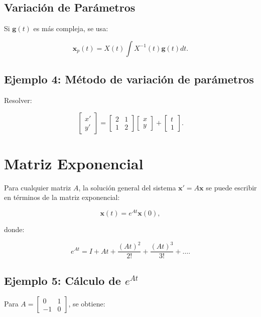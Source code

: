 \subsection{Variación de Parámetros}
Si \( \mathbf{g}(t) \) es más compleja, se usa:

\begin{equation}
\mathbf{x}_p(t) = X(t) \int X^{-1}(t) \mathbf{g}(t) dt.
\end{equation}

\subsection*{Ejemplo 4: Método de variación de parámetros}
Resolver:

\begin{equation}
\begin{bmatrix} x' \\ y' \end{bmatrix} =
\begin{bmatrix} 2 & 1 \\ 1 & 2 \end{bmatrix}
\begin{bmatrix} x \\ y \end{bmatrix} +
\begin{bmatrix} t \\ 1 \end{bmatrix}.
\end{equation}

\section{Matriz Exponencial}
Para cualquier matriz \( A \), la solución general del sistema \( \mathbf{x'} = A\mathbf{x} \) se puede escribir en términos de la matriz exponencial:

\begin{equation}
\mathbf{x}(t) = e^{At} \mathbf{x}(0),
\end{equation}

donde:

\begin{equation}
e^{At} = I + At + \frac{(At)^2}{2!} + \frac{(At)^3}{3!} + \dots.
\end{equation}

\subsection*{Ejemplo 5: Cálculo de \( e^{At} \)}
Para \( A = \begin{bmatrix} 0 & 1 \\ -1 & 0 \end{bmatrix} \), se obtiene:

